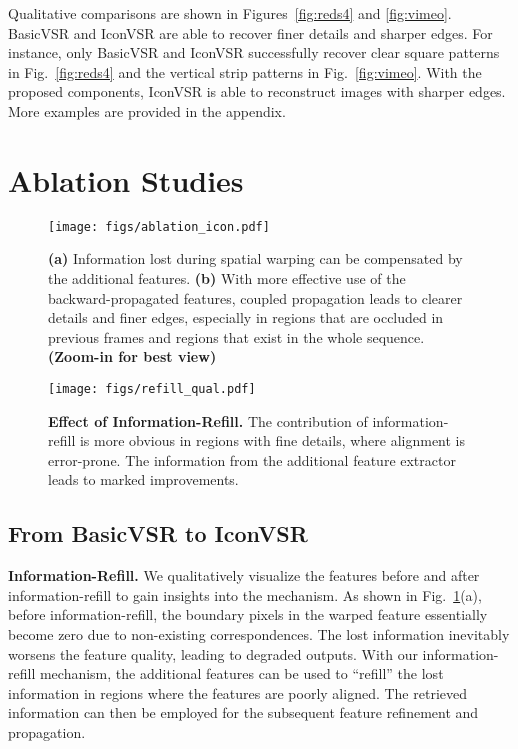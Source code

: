 \documentclass[final]{cvpr}
\begin{document}
Qualitative comparisons are shown in Figures~\ref{fig:reds4} and \ref{fig:vimeo}. \mbox{BasicVSR} and \mbox{IconVSR} are able to recover finer details and sharper edges. For instance, only \mbox{BasicVSR} and \mbox{IconVSR} successfully recover clear square patterns in Fig.~\ref{fig:reds4} and the vertical strip patterns in Fig.~\ref{fig:vimeo}. With the proposed components, \mbox{IconVSR} is able to reconstruct images with sharper edges. More examples are provided in the appendix.
 

\section{Ablation Studies}
\label{sec:ablation}
\begin{figure}[!t]
	\begin{center}
		\hspace{-0.3cm}\texttt{[image: figs/ablation\_icon.pdf]}
		\caption{\textbf{(a)} Information lost during spatial warping can be compensated by the additional features. \textbf{(b)} With more effective use of the backward-propagated features, coupled propagation leads to clearer details and finer edges, especially in regions that are occluded in previous frames and regions that exist in the whole sequence. \textbf{(Zoom-in for best view)}}
		\vspace{-0.6cm}
		\label{fig:icon}
	\end{center}
\end{figure}
\begin{figure}[!t]
	\begin{center}
		\texttt{[image: figs/refill\_qual.pdf]}
		\caption{\textbf{Effect of Information-Refill.} The contribution of information-refill is more obvious in regions with fine details, where alignment is error-prone. The information from the additional feature extractor leads to marked improvements.}
		\vspace{-0.6cm}
		\label{fig:refill_qual}
	\end{center}
\end{figure}
\subsection{From \mbox{BasicVSR} to \mbox{IconVSR}}
\label{sec:basic-vs-icon}
\noindent\textbf{Information-Refill.}
We qualitatively visualize the features before and after information-refill to gain insights into the mechanism. As shown in Fig.~\ref{fig:icon}(a), before information-refill, the boundary pixels in the warped feature essentially become zero due to non-existing correspondences. The lost information inevitably worsens the feature quality, leading to degraded outputs.
With our information-refill mechanism, the additional features can be used to ``refill'' the lost information in regions where the features are poorly aligned. The retrieved information can then be employed for the subsequent feature refinement and propagation.
\end{document}
